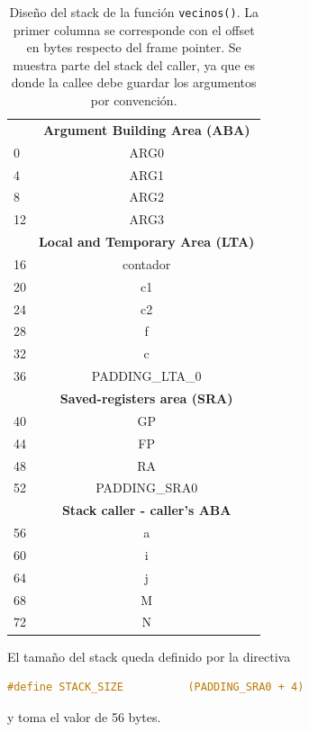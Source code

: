 \documentclass[a4paper,12pt]{article}
\numberwithin{equation}{section}
\numberwithin{figure}{section}
\begin{document}
\begin{table}[H]
	\centering
	\begin{tabular}{@{}l|c|@{}}
		\cmidrule(l){2-2}
		\multicolumn{1}{c|}{\textbf{}} & \textbf{Argument Building Area (ABA)} \\ \cmidrule(l){2-2} 
		0 & ARG0 \\ \cmidrule(l){2-2} 
		4 & ARG1 \\ \cmidrule(l){2-2} 
		8 & ARG2 \\ \cmidrule(l){2-2} 
		12 & ARG3 \\ \cmidrule(l){2-2} 
		\multicolumn{1}{c|}{\textbf{}} & \textbf{Local and Temporary Area (LTA)} \\ \cmidrule(l){2-2} 
		16 & contador \\ \cmidrule(l){2-2} 
		20 & c1 \\ \cmidrule(l){2-2} 
		24 & c2 \\ \cmidrule(l){2-2} 
		28 & f \\ \cmidrule(l){2-2} 
		32 & c \\ \cmidrule(l){2-2} 
		36 & PADDING\_LTA\_0 \\ \cmidrule(l){2-2} 
		\multicolumn{1}{c|}{\textbf{}} & \textbf{Saved-registers area (SRA)} \\ \cmidrule(l){2-2} 
		40 & GP \\ \cmidrule(l){2-2} 
		44 & FP \\ \cmidrule(l){2-2} 
		48 & RA \\ \cmidrule(l){2-2} 
		52 & PADDING\_SRA0 \\ \cmidrule(l){2-2} 
		\multicolumn{1}{c|}{\textbf{}} & \textbf{Stack caller - caller's ABA} \\ \cmidrule(l){2-2} 
		56 & a \\ \cmidrule(l){2-2} 
		60 & i \\ \cmidrule(l){2-2} 
		64 & j \\ \cmidrule(l){2-2} 
		68 & M \\ \cmidrule(l){2-2} 
		72 & N \\ \cmidrule(l){2-2} 
	\end{tabular}
	\caption{Diseño del stack de la función \texttt{vecinos()}. La primer columna se corresponde con el offset en bytes respecto del frame pointer. Se muestra parte del stack del caller, ya que es donde la callee debe guardar los argumentos por convención.}
	\label{stack_vecinos}
\end{table}

El tamaño del stack queda definido por la directiva
\begin{lstlisting}[language=C, style=StyleC]
#define STACK_SIZE          (PADDING_SRA0 + 4)
\end{lstlisting}
y toma el valor de \SI{56}{} bytes.
\end{document}
